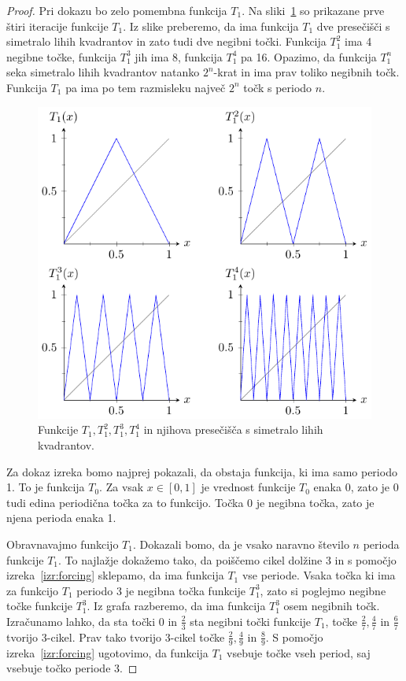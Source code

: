 \documentclass[mat2]{fmfdelo}
\begin{document}
\begin{proof}
Pri dokazu bo zelo pomembna funkcija $T_1$. Na sliki~\ref{fig:T1} so prikazane prve štiri iteracije funkcije $T_1$. Iz slike preberemo, da ima funkcija $T_1$ dve presečišči s simetralo lihih kvadrantov in zato tudi dve negibni točki. Funkcija $T_1^2$ ima 4 negibne točke, funkcija $T_1^3$ jih ima 8, funkcija $T_1^4$ pa 16. Opazimo, da funkcija $T_1^n$ seka simetralo lihih kvadrantov natanko $2^n$-krat in ima prav toliko negibnih točk. Funkcija $T_1$ pa ima po tem razmisleku največ $2^n$ točk s periodo $n$.
\begin{figure}[h]
  \centering
  \includegraphics{images/funkcija_T1.pdf}
  \caption[Primer vektorske slike.]{Funkcije $T_1, T_1^2, T_1^3, T_1^4$ in njihova presečišča s simetralo lihih kvadrantov.}
  \label{fig:T1}
\end{figure}

Za dokaz izreka bomo najprej pokazali, da obstaja funkcija, ki ima samo periodo 1. To je funkcija $T_0$. Za vsak $x \in [0, 1]$ je vrednost funkcije $T_0$ enaka 0, zato je 0 tudi edina periodična točka za to funkcijo. Točka 0 je negibna točka, zato je njena perioda enaka 1.

Obravnavajmo funkcijo $T_1$. Dokazali bomo, da je vsako naravno število $n$ perioda funkcije $T_1$. To najlažje dokažemo tako, da poiščemo cikel dolžine 3 in s pomočjo izreka~\ref{izr:forcing} sklepamo, da ima funkcija $T_1$ vse periode. Vsaka točka ki ima za funkcijo $T_1$ periodo 3 je negibna točka funkcije $T_1^3$, zato si poglejmo negibne točke funkcije $T_1^3$. Iz grafa razberemo, da ima funkcija $T_1^3$ osem negibnih točk. Izračunamo lahko, da sta točki 0 in $\frac{2}{3}$ sta negibni točki funkcije $T_1$, točke $\frac{2}{7}, \frac{4}{7}$ in $\frac{6}{7}$ tvorijo 3-cikel. Prav tako tvorijo 3-cikel točke  $\frac{2}{9}, \frac{4}{9}$ in $\frac{8}{9}$. S pomočjo izreka~\ref{izr:forcing} ugotovimo, da funkcija $T_1$ vsebuje točke vseh period, saj vsebuje točko periode 3.


\end{proof}
\end{document}
